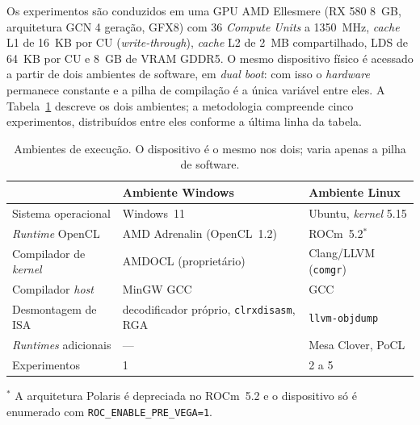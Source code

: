

Os experimentos são conduzidos em uma GPU AMD Ellesmere (RX 580 8~GB, arquitetura GCN 4\textordfeminine{} geração, GFX8) com 36 \textit{Compute Units} a 1350~MHz, \textit{cache} L1 de 16~KB por CU (\textit{write-through}), \textit{cache} L2 de 2~MB compartilhado, LDS de 64~KB por CU e 8~GB de VRAM GDDR5. O mesmo dispositivo físico é acessado
a partir de dois ambientes de software, em \textit{dual boot}: com isso o
\textit{hardware} permanece constante e a pilha de compilação é a única variável
entre eles. A Tabela~\ref{tab:ambiente} descreve os dois ambientes; a metodologia
compreende cinco experimentos, distribuídos entre eles conforme a última linha
da tabela.


\begin{table}[ht]
\centering
\caption{Ambientes de execução. O dispositivo é o mesmo nos dois; varia apenas a
pilha de software.}
\label{tab:ambiente}
\small
\begin{tabular}{@{}lll@{}}
\toprule
 & \textbf{Ambiente Windows} & \textbf{Ambiente Linux} \\
\midrule
Sistema operacional & Windows~11 & Ubuntu, \textit{kernel} 5.15 \\
\textit{Runtime} OpenCL & AMD Adrenalin (OpenCL~1.2) & ROCm~5.2$^\ast$ \\
Compilador de \textit{kernel} & AMDOCL (proprietário) & Clang/LLVM (\texttt{comgr}) \\
Compilador \textit{host} & MinGW GCC & GCC \\
Desmontagem de ISA & decodificador próprio, \texttt{clrxdisasm}, RGA & \texttt{llvm-objdump} \\
\textit{Runtimes} adicionais & --- & Mesa Clover, PoCL \\
Experimentos & 1 & 2 a 5 \\
\bottomrule
\end{tabular}

\vspace{2pt}
{\footnotesize $^\ast$ A arquitetura Polaris é depreciada no ROCm~5.2 e o
dispositivo só é enumerado com \texttt{ROC\_ENABLE\_PRE\_VEGA=1}.}
\end{table}

